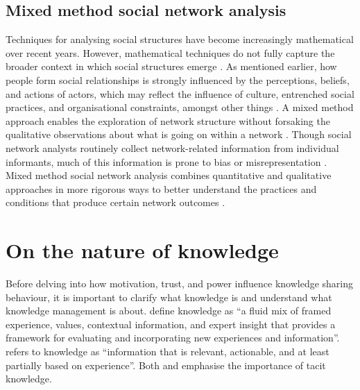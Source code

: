 \subsection{Mixed method social network analysis}

Techniques for analysing social structures have become increasingly mathematical over recent years. However, mathematical techniques do not fully capture the broader context in which social structures emerge \citep{edwards2010esrc}. As mentioned earlier, how people form social relationships is strongly influenced by the perceptions, beliefs, and actions of actors, which may reflect the influence of culture, entrenched social practices, and organisational constraints, amongst other things \citep{dominguez2014mixed}. A mixed method approach enables the exploration of network structure without forsaking the qualitative observations about what is going on within a network \citep{crossley2015cases}. Though social network analysts routinely collect network-related information from individual informants, much of this information is prone to bias or misrepresentation \citep{williams2017mixed}. Mixed method social network analysis combines quantitative and qualitative approaches in more rigorous ways to better understand the practices and conditions that produce certain network outcomes \citep{dominguez2014mixed}. \medskip

\section{On the nature of knowledge}

Before delving into how motivation, trust, and power influence knowledge sharing behaviour, it is important to clarify what knowledge is and understand what knowledge management is about. \citet{davenport1998working} define knowledge as \enquote{a fluid mix of framed experience, values, contextual information, and expert insight that provides a framework for evaluating and incorporating new experiences and information}. \citet{leonard1998role} refers to knowledge as \enquote{information that is relevant, actionable, and at least partially based on experience}. Both \citet{davenport1998working} and \citet{leonard1998role} emphasise the importance of tacit knowledge. \medskip

